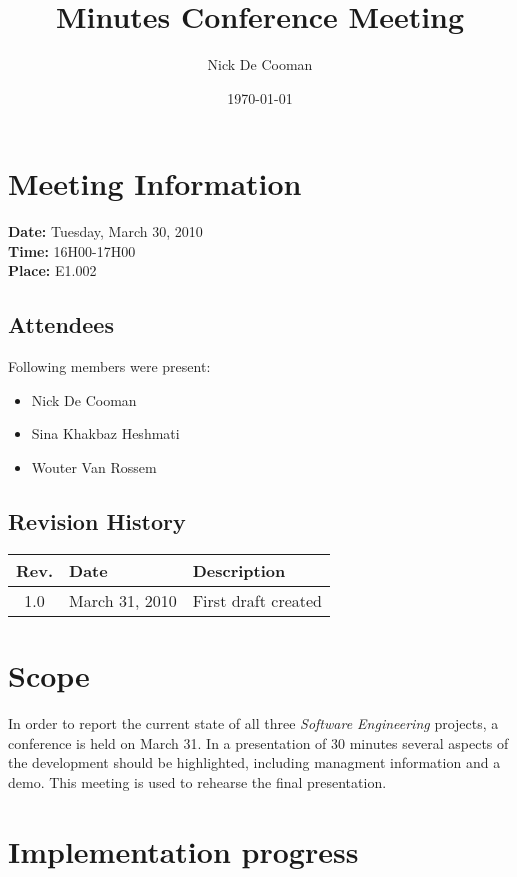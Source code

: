 \documentclass[a4paper, 12pt]{article}
\begin{document}
\title{Minutes Conference Meeting}
\author{Nick De Cooman}
\date{\today}

\maketitle	
	\section{Meeting Information}
		\textbf{Date:} Tuesday, March 30, 2010\\
		\textbf{Time:} 16H00-17H00\\
		\textbf{Place:} E1.002\\
		
		\subsection{Attendees}
Following members were present:
			\begin{itemize}
				\item Nick De Cooman
				\item Sina Khakbaz Heshmati
				\item Wouter Van Rossem
			\end{itemize}
			
		\subsection{Revision History}
			\begin{tabular}{c | l | l }
				\textbf{Rev.} & \textbf{Date} & \textbf{Description} \\
				\hline
				1.0 & March 31, 2010 & First draft created \\

			\end{tabular}		

\section{Scope}

In order to report the current state of all three \emph{Software Engineering} projects, a conference is held on March 31. In a presentation of 30 minutes several aspects of the development should be highlighted, including managment information and a demo. This meeting is used to rehearse the final presentation. 

\section{Implementation progress}
\end{document}
